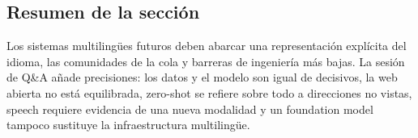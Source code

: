 \subsection{Resumen de la sección}

Los sistemas multilingües futuros deben abarcar una representación explícita del idioma, las comunidades de la cola y barreras de ingeniería más bajas. La sesión de Q\&A añade precisiones: los datos y el modelo son igual de decisivos, la web abierta no está equilibrada, zero-shot se refiere sobre todo a direcciones no vistas, speech requiere evidencia de una nueva modalidad y un foundation model tampoco sustituye la infraestructura multilingüe.
